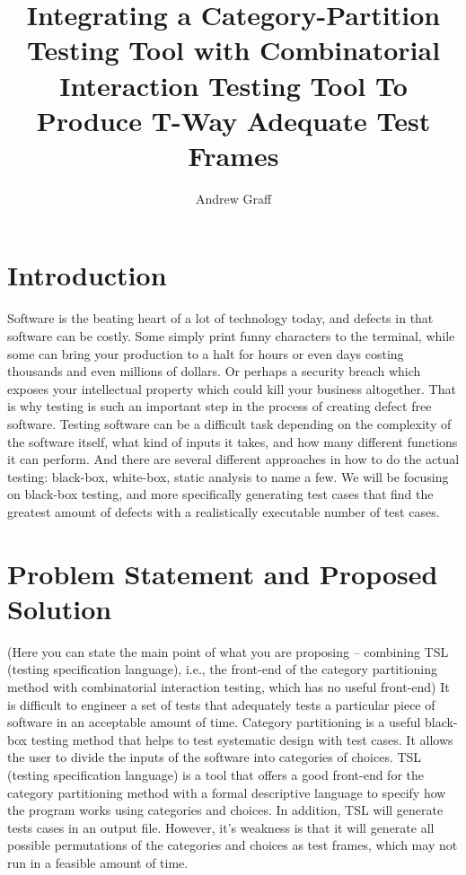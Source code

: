 \documentclass[a4full,12pt]{article}
\title{Integrating a Category-Partition Testing Tool with Combinatorial Interaction
Testing Tool To Produce T-Way Adequate Test Frames}
\author{Andrew Graff}
\newcommand{\eas}[1]{{\color{blue}\sf ({#1})}}
\begin{document}
\maketitle
\section{Introduction}
Software is the beating heart of a lot of technology today, and defects in that software
  can be costly. Some simply print funny characters to the terminal, while some can bring
  your production to a halt for hours or even days costing thousands and even millions of
  dollars. Or perhaps a security breach which exposes your intellectual property which
  could kill your business altogether. That is why testing is such an important step in
  the process of creating defect free software. Testing software can be a difficult task
  depending on the complexity of the software itself, what kind of inputs it takes, and how
  many different functions it can perform. And there are several different approaches in how
  to do the actual testing: black-box, white-box, static analysis to name a few. We will be
  focusing on black-box testing, and more specifically generating test cases that find the
  greatest amount of defects with a realistically executable number of test cases.
  
\section{Problem Statement and Proposed Solution}
  \eas{Here you can state the main point of what you are proposing -- combining TSL (testing specification language), i.e., the front-end of the category partitioning method with combinatorial interaction testing, which has no useful front-end}
It is difficult to engineer a set of tests that adequately tests a particular piece of software
  in an acceptable amount of time. Category partitioning is a useful black-box testing method that
  helps to test systematic design with test cases. It allows the user to divide
  the inputs of the software into categories of choices. TSL (testing specification language) is a tool
  that offers a good front-end for the category partitioning method with a formal descriptive language
  to specify how the program works using categories and choices. In addition, TSL will generate tests
  cases in an output file. However, it's weakness is that it will generate all possible permutations of
  the categories and choices as test frames, which may not run in a feasible amount of time.
  
\end{document}
